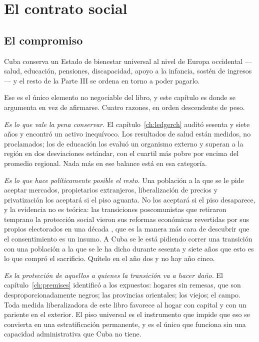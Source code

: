 \chapter{El contrato social}
\label{ch:welfare}

\section{El compromiso}

Cuba conserva un Estado de bienestar universal al nivel de Europa occidental
---salud, educación, pensiones, discapacidad, apoyo a la infancia, sostén de
ingresos--- y el resto de la Parte III se ordena en torno a poder pagarlo.

Ese es el único elemento no negociable del libro, y este capítulo es donde se
argumenta en vez de afirmarse. Cuatro razones, en orden descendente de peso.

\emph{Es lo que vale la pena conservar.} El capítulo~\ref{ch:ledgerch} auditó
sesenta y siete años y encontró un activo inequívoco. Los resultados de salud están
medidos, no proclamados; los de educación los evaluó un organismo externo y superan
a la región en dos desviaciones estándar, con el cuartil más pobre por encima del
promedio regional. Nada más en ese balance está en esa categoría.

\emph{Es lo que hace políticamente posible el resto.} Una población a la que se le
pide aceptar mercados, propietarios extranjeros, liberalización de precios y
privatización los aceptará si el piso aguanta. No los aceptará si el piso
desaparece, y la evidencia no es teórica: las transiciones poscomunistas que
retiraron temprano la protección social vieron sus reformas económicas revertidas
por sus propios electorados en una década \citep{roland2000}, que es la manera más
cara de descubrir que el consentimiento es un insumo. A Cuba se le está pidiendo
correr una transición con una población a la que se le ha dicho durante sesenta y
siete años que esto es lo que compró el sacrificio. Quítelo en el año dos y no hay
año cinco.

\emph{Es la protección de aquellos a quienes la transición va a hacer daño.} El
capítulo~\ref{ch:premises} identificó a los expuestos: hogares sin remesas, que son
desproporcionadamente negros; las provincias orientales; los viejos; el campo. Toda
medida liberalizadora de este libro favorece al hogar con capital y con un pariente
en el exterior. El piso universal es el instrumento que impide que eso se convierta
en una estratificación permanente, y es el único que funciona sin una capacidad
administrativa que Cuba no tiene.

